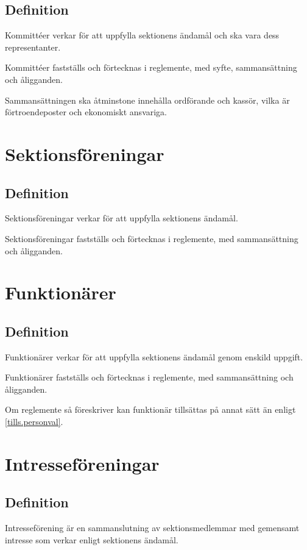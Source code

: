 \documentclass{styrdokument}
\begin{document}
\subsection{Definition}

\? Kommittéer verkar för att uppfylla sektionens ändamål och ska vara dess representanter.

\? Kommittéer fastställs och förtecknas i reglemente, med syfte, sammansättning och åligganden.

\? Sammansättningen ska åtminstone innehålla ordförande och kassör, vilka är förtroendeposter och ekonomiskt ansvariga.

\section{Sektionsföreningar}
\subsection{Definition}

\? Sektionsföreningar verkar för att uppfylla sektionens ändamål.

\? Sektionsföreningar fastställs och förtecknas i reglemente, med sammansättning och åligganden.

\section{Funktionärer}
\subsection{Definition}

\? Funktionärer verkar för att uppfylla sektionens ändamål genom enskild uppgift.

\? Funktionärer fastställs och förtecknas i reglemente, med sammansättning och åligganden.

\? Om reglemente så föreskriver kan funktionär tillsättas på annat sätt än enligt \cref{tills.personval}.

\section{Intresseföreningar}
\subsection{Definition}

\? Intresseförening är en sammanslutning av sektionsmedlemmar med gemensamt intresse som verkar enligt sektionens ändamål.
\end{document}
